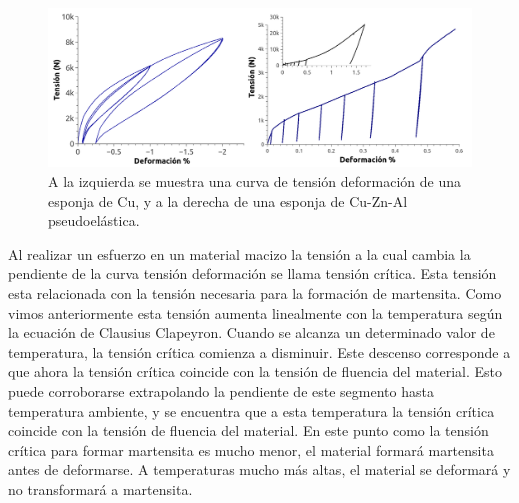 \documentclass[a4paper,12pt,fleqn,twoside,openany]{book}
\begin{document}


\begin{figure}[h]
 \centering
 \includegraphics[width=1\textwidth]{EspA100yEspCu.png}
 \caption{A la izquierda se muestra una curva de tensión deformación de una esponja de Cu, y a la derecha de una esponja 
 de Cu-Zn-Al pseudoelástica.} 
 \label{fig:memoria}
 \end{figure}


Al realizar un esfuerzo en un material macizo la tensión a la cual cambia la pendiente de la curva tensión deformación se llama tensión crítica. Esta 
tensión esta relacionada con la tensión necesaria para la formación de martensita. Como vimos anteriormente esta tensión aumenta linealmente con la temperatura según la 
ecuación de Clausius Clapeyron. Cuando se alcanza un determinado valor de temperatura, la tensión crítica comienza a disminuir. Este descenso corresponde a que ahora la tensión crítica 
coincide con la tensión de fluencia del material. Esto puede corroborarse extrapolando la pendiente de este segmento hasta temperatura ambiente, y se encuentra que a esta 
temperatura la tensión crítica coincide con la tensión de fluencia del material. En este punto como la tensión crítica para formar martensita es mucho menor, el 
material formará martensita antes de deformarse. A temperaturas mucho más altas, el material se deformará y no transformará a martensita.
\end{document}
